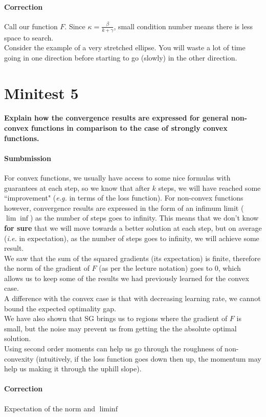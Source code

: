 \documentclass{article}
\newcommand{\1}{\mathbf{1}}
\newcommand{\ie}{\textit{i.e. }}
\newcommand{\eg}{\textit{e.g. }}
\begin{document}
\paragraph{Correction} Call our function \(F\). Since \(\kappa = \frac{\beta}{k + \gamma}\), small condition number means there is less space to search. \\
Consider the example of a very stretched ellipse. You will waste a lot of time going in one direction before starting to go (slowly) in the other direction.

\section{Minitest 5}
\paragraph{Explain how the convergence results are  expressed for general non-convex functions in comparison to the case of strongly convex functions.}
\paragraph{Sumbmission}
For convex functions, we usually have access to some nice formulas with guarantees at each step, so we know that after \(k\) steps, we will have reached some ``improvement" (\eg in terms of the loss function). For non-convex functions however, convergence results are expressed in the form of an infimum limit (\(\lim \inf\)) as the number of steps goes to infinity. This means that we don't know \textbf{for sure} that we will move towards a better solution at each step, but on average (\ie in expectation), as the number of steps goes to infinity, we will achieve some result. \\
We saw that the sum of the squared gradients (its expectation) is finite, therefore the norm of the gradient of \(F\) (as per the lecture notation) goes to 0, which allows us to keep some of the results we had previously learned for the convex case. \\
A difference with the convex case is that with decreasing learning rate, we cannot bound the expected optimality gap. \\
We have also shown that SG brings us to regions where the gradient of \(F\) is small, but the noise may prevent us from getting the the absolute optimal solution.
\\
Using second order moments can help us go through the roughness of non-convexity (intuitively, if the loss function goes down then up, the momentum may help us making it through the uphill slope). 

\paragraph{Correction}
Expectation of the norm and \(\liminf\)
\end{document}
